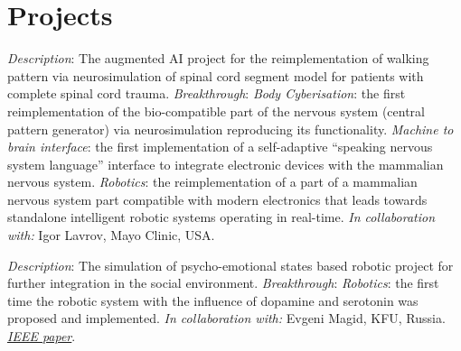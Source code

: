 \documentclass{moderncv}
\begin{document}


    \section{Projects}
    {\small \emph{Description}: The augmented AI project for the reimplementation of walking pattern via neurosimulation of spinal cord segment model for patients with complete spinal cord trauma. \newline{}
    \emph{Breakthrough}:
    \emph{Body Cyberisation}: the first reimplementation of the bio-compatible part of the nervous system (central pattern generator) via neurosimulation reproducing its functionality.
    \emph{Machine to brain interface}: the first implementation of a self-adaptive ``speaking nervous system language'' interface to integrate electronic devices with the mammalian nervous system.
    \emph{Robotics}: the reimplementation of a part of a mammalian nervous system part compatible with modern electronics that leads towards standalone intelligent robotic systems operating in real-time.
    \emph{In collaboration with:} Igor Lavrov, Mayo Clinic, USA.}

    {\small \emph{Description}: The simulation of psycho-emotional states based robotic project for further integration in the social environment. \newline{}
    \emph{Breakthrough}:
    \emph{Robotics}: the first time the robotic system with the influence of dopamine and serotonin was proposed and implemented.
    \emph{In collaboration with:} Evgeni Magid, KFU, Russia.
    \href{https://ieeexplore.ieee.org/document/9073255}{\emph{IEEE paper}}.}
\end{document}
